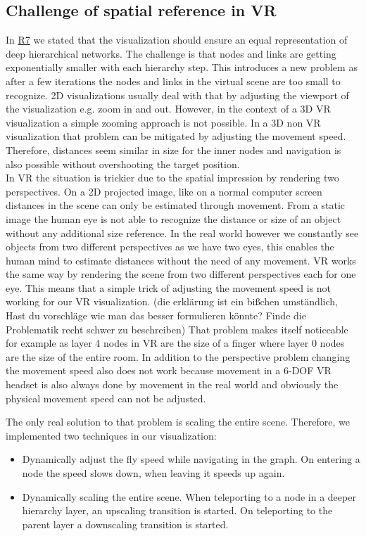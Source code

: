 \subsection{Challenge of spatial reference in VR}
\label{chap:ps-spatialReference}
In \hyperref[req:R7]{R7} we stated that the visualization should ensure an equal representation of deep hierarchical networks. The challenge is that nodes and links are getting exponentially smaller with each hierarchy step.
This introduces a new problem as after a few iterations the nodes and links in the virtual scene are too small to recognize.
2D visualizations usually deal with that by adjusting the viewport of the visualization e.g. zoom in and out. 
However, in the context of a 3D VR visualization a simple zooming approach is not possible. 
In a 3D non VR visualization that problem can be mitigated by adjusting the movement speed. Therefore, distances seem similar in size for the inner nodes and navigation is also possible without overshooting the target position.\\ 
In VR the situation is trickier due to the spatial impression by rendering two perspectives. On a 2D projected image, like on a normal computer screen distances in the scene can only be estimated through movement. From a static image the human eye is not able to recognize the distance or size of an object without any additional size reference. 
In the real world however we constantly see objects from two different perspectives as we have two eyes, this enables the human mind to estimate distances without the need of any movement. VR works the same way by rendering the scene from two different perspectives each for one eye.  
This means that a simple trick of adjusting the movement speed is not working for our VR visualization. (die erklärung ist ein bißchen umständlich, Hast du vorschläge wie man das besser formulieren könnte? Finde die Problematik recht schwer zu beschreiben)
That problem makes itself noticeable for example as layer 4 nodes in VR are the size of a finger where layer 0 nodes are the size of the entire room.
In addition to the perspective problem changing the movement speed also does not work because movement in a 6-DOF VR headset is also always done by movement in the real world and obviously the physical movement speed can not be adjusted.

The only real solution to that problem is scaling the entire scene. Therefore, we implemented two techniques in our visualization:
\begin{itemize}
    \item Dynamically adjust the fly speed while navigating in the graph. On entering a node the speed slows down, when leaving it speeds up again. 
    \item Dynamically scaling the entire scene. When teleporting to a node in a deeper hierarchy layer, an upscaling transition is started. On teleporting to the parent layer a downscaling transition is started. 
\end{itemize} 

